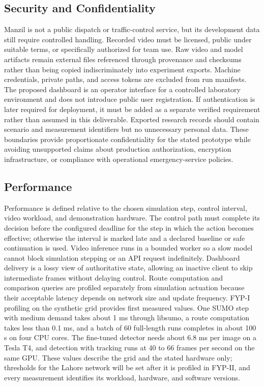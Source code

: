 \subsection{Security and Confidentiality}

Manzil is not a public dispatch or traffic-control service, but its development data still require controlled handling. Recorded video must be licensed, public under suitable terms, or specifically authorized for team use. Raw video and model artifacts remain external files referenced through provenance and checksums rather than being copied indiscriminately into experiment exports. Machine credentials, private paths, and access tokens are excluded from run manifests. The proposed dashboard is an operator interface for a controlled laboratory environment and does not introduce public user registration. If authentication is later required for deployment, it must be added as a separate verified requirement rather than assumed in this deliverable. Exported research records should contain scenario and measurement identifiers but no unnecessary personal data. These boundaries provide proportionate confidentiality for the stated prototype while avoiding unsupported claims about production authorization, encryption infrastructure, or compliance with operational emergency-service policies.

\subsection{Performance}

Performance is defined relative to the chosen simulation step, control interval, video workload, and demonstration hardware. The control path must complete its decision before the configured deadline for the step in which the action becomes effective; otherwise the interval is marked late and a declared baseline or safe continuation is used. Video inference runs in a bounded worker so a slow model cannot block simulation stepping or an API request indefinitely. Dashboard delivery is a lossy view of authoritative state, allowing an inactive client to skip intermediate frames without delaying control. Route computation and comparison queries are profiled separately from simulation actuation because their acceptable latency depends on network size and update frequency. FYP-I profiling on the synthetic grid provides first measured values. One SUMO step with medium demand takes about 1 ms through libsumo, a route computation takes less than 0.1 ms, and a batch of 60 full-length runs completes in about 100 s on four CPU cores. The fine-tuned detector needs about 6.8 ms per image on a Tesla T4, and detection with tracking runs at 40 to 66 frames per second on the same GPU. These values describe the grid and the stated hardware only; thresholds for the Lahore network will be set after it is profiled in FYP-II, and every measurement identifies its workload, hardware, and software versions.


